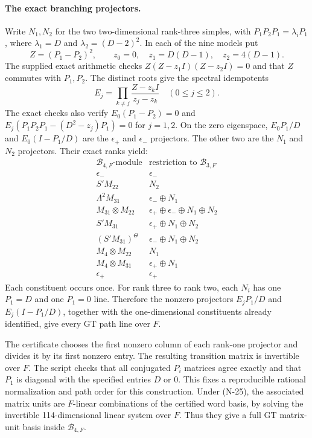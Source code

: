 \paragraph{The exact branching projectors.}
Write $N_1,N_2$ for the two two-dimensional rank-three simples,
with $P_1P_2P_1=\lambda_iP_1$, where
$\lambda_1=D$ and $\lambda_2=(D-2)^2$.  In each of the nine models put
\[
 Z=(P_1-P_2)^2,\qquad z_0=0,\quad z_1=D(D-1),\quad z_2=4(D-1).
\]
The supplied exact arithmetic checks
$Z(Z-z_1I)(Z-z_2I)=0$ and that $Z$ commutes with $P_1,P_2$.
The distinct roots give the spectral idempotents
\[
 E_j=\prod_{k\ne j}\frac{Z-z_kI}{z_j-z_k}\quad(0\le j\le2).
 \tag{N-31}
\]
The exact checks also verify $E_0(P_1-P_2)=0$ and
$E_j(P_1P_2P_1-(D^2-z_j)P_1)=0$ for $j=1,2$.
On the zero eigenspace, $E_0P_1/D$ and $E_0(I-P_1/D)$ are the
$\epsilon_+$ and $\epsilon_-$ projectors.  The other two are the
$N_1$ and $N_2$ projectors.  Their exact ranks yield:
\[
\begin{array}{c|l}
\mathcal B_{4,F}\text{-module}&\text{restriction to }\mathcal B_{3,F}\\\hline
\epsilon_-&\epsilon_-\\
S'M_{22}&N_2\\
\Lambda^2M_{31}&\epsilon_-\oplus N_1\\
M_{31}\otimes M_{22}&\epsilon_+\oplus\epsilon_-\oplus N_1\oplus N_2\\
S'M_{31}&\epsilon_+\oplus N_1\oplus N_2\\
(S'M_{31})^\Theta&\epsilon_-\oplus N_1\oplus N_2\\
M_4\otimes M_{22}&N_1\\
M_4\otimes M_{31}&\epsilon_+\oplus N_1\\
\epsilon_+&\epsilon_+
\end{array}
 \tag{N-32}
\]
Each constituent occurs once.  For rank three to rank two, each $N_i$
has one $P_1=D$ and one $P_1=0$ line.  Therefore the nonzero projectors
$E_jP_1/D$ and $E_j(I-P_1/D)$, together with the one-dimensional
constituents already identified, give every GT path line over $F$.

The certificate chooses the first nonzero column of each rank-one
projector and divides it by its first nonzero entry.  The resulting
transition matrix is invertible over $F$.  The script checks that all
conjugated $P_i$ matrices agree exactly and that $P_1$ is diagonal with
the specified entries $D$ or $0$.  This fixes a reproducible rational
normalization and path order for this construction.  Under (N-25),
the associated matrix units are $F$-linear combinations of the
certified word basis, by solving the invertible 114-dimensional
linear system over $F$.  Thus they give a full GT matrix-unit basis
inside $\mathcal B_{4,F}$.

